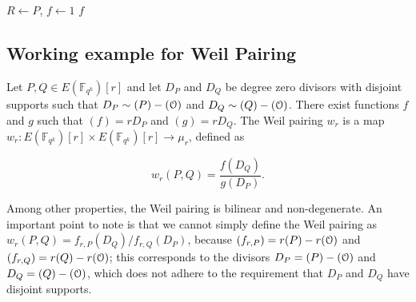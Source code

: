 

\begin{algorithm}
	\caption{Miller's Algorithm}
	$R \leftarrow P$, $f \leftarrow 1$\;
	\Return $f$\;
	\label{alg:millersalgorithmpractice}
\end{algorithm}







\subsection{Working example for Weil Pairing}
\label{ssec:ch2.weilpairing}


Let $P, Q \in E(\mathbb{F}_{q^k})[r]$ and let $D_P$ and $D_Q$ be degree zero
divisors with disjoint supports such that $D_P \sim (P) - (\EuScript{O})$ and
$D_Q \sim (Q) - (\EuScript{O})$. There exist functions $f$ and $g$ such that
$(f) = rD_P$ and $(g) = rD_Q$. The Weil pairing $w_r$ is a map $w_r : E(\mathbb{F}_{q^k})[r] \times E(\mathbb{F}_{q^k})[r] \to \mu_r$, defined as

\[
w_r(P, Q) = \frac{f(D_Q)}{g(D_P)}.
\]

Among other properties, the Weil pairing is bilinear and non-degenerate. An
important point to note is that we cannot simply define the Weil pairing as
$w_r(P, Q) = f_{r,P}(D_Q) / f_{r,Q}(D_P)$, because $(f_{r,P}) = r(P) -
r(\EuScript{O})$ and $(f_{r,Q}) = r(Q) - r(\EuScript{O})$; this corresponds to
the divisors $D_P = (P) - (\EuScript{O})$ and $D_Q = (Q) - (\EuScript{O})$,
which does not adhere to the requirement that $D_P$ and $D_Q$ have disjoint
supports.

